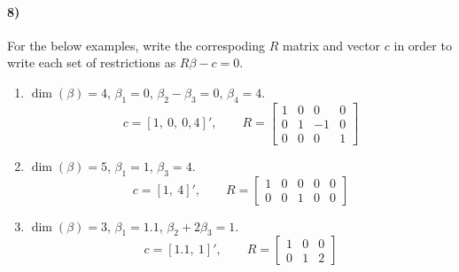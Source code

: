 \documentclass[12pt]{article}
\newcommand\barr{\begin{array}}
\newcommand\earr{\end{array}}
\numberwithin{equation}{section}
\numberwithin{figure}{section}
\numberwithin{table}{section}
\begin{document}
\paragraph{8)} For the below examples, write the correspoding $R$ matrix and vector $c$ in order to write each set of restrictions as $R\beta-c=0$.
\begin{enumerate}
\item $\dim(\beta)=4$, $\beta_1=0$, $\beta_2-\beta_3=0$, $\beta_4=4$. \\
  {\color{blue} 
    \[c = [1,\ 0,\ 0,4]',\qquad R=\left[\barr{cccc} 1 & 0 & 0 & 0 \\ 0 & 1 & -1 & 0 \\ 0 & 0 & 0 & 1 \earr\right]\]
    }
\item $\dim(\beta)=5$, $\beta_1=1$, $\beta_3 = 4$.
  {\color{blue} 
    \[c = [1,\ 4]',\qquad R=\left[\barr{ccccc} 1 & 0 & 0 & 0 & 0 \\ 0 & 0 & 1 & 0 & 0 \earr\right]\]
    }
\item $\dim(\beta) = 3$, $\beta_1 = 1.1$, $\beta_2 + 2\beta_3 = 1$.
  {\color{blue} 
    \[c = [1.1,\ 1]',\qquad R=\left[\barr{ccc} 1 & 0 & 0 \\ 0 & 1 & 2 \earr\right]\]
    }

\end{enumerate}
\end{document}
